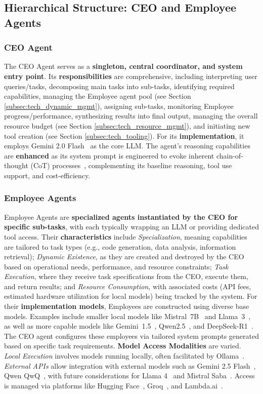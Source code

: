 \documentclass[twocolumn]{article}
\begin{document}
\subsection{Hierarchical Structure: CEO and Employee Agents}

\subsubsection{CEO Agent}
The CEO Agent serves as a \textbf{singleton, central coordinator, and system entry point}. Its \textbf{responsibilities} are comprehensive, including interpreting user queries/tasks, decomposing main tasks into sub-tasks, identifying required capabilities, managing the Employee agent pool (see Section \ref{subsec:tech_dynamic_mgmt}), assigning sub-tasks, monitoring Employee progress/performance, synthesizing results into final output, managing the overall resource budget (see Section \ref{subsec:tech_resource_mgmt}), and initiating new tool creation (see Section \ref{subsec:tech_tooling}). For its \textbf{implementation}, it employs Gemini 2.0 Flash~\cite{gemini20flash} as the core LLM. The agent's reasoning capabilities are \textbf{enhanced} as its system prompt is engineered to evoke inherent chain-of-thought (CoT) processes~\cite{wei2022chain}, complementing its baseline reasoning, tool use support, and cost-efficiency.

\subsubsection{Employee Agents}
Employee Agents are \textbf{specialized agents instantiated by the CEO for specific sub-tasks}, with each typically wrapping an LLM or providing dedicated tool access.
Their \textbf{characteristics} include \textit{Specialization}, meaning capabilities are tailored to task types (e.g., code generation, data analysis, information retrieval); \textit{Dynamic Existence}, as they are created and destroyed by the CEO based on operational needs, performance, and resource constraints; \textit{Task Execution}, where they receive task specifications from the CEO, execute them, and return results; and \textit{Resource Consumption}, with associated costs (API fees, estimated hardware utilization for local models) being tracked by the system.
For their \textbf{implementation models}, Employees are constructed using diverse base models. Examples include smaller local models like Mistral~7B~\cite{jiang2023mistral} and Llama~3~\cite{llama3herd}, as well as more capable models like Gemini~1.5~\cite{gemini1.5_report}, Qwen2.5~\cite{qwen2.5_report}, and DeepSeek-R1~\cite{deepseekr1_report}. The CEO agent configures these employees via tailored system prompts generated based on specific task requirements.
\textbf{Model Access Modalities} are varied. \textit{Local Execution} involves models running locally, often facilitated by Ollama~\cite{ollama}. \textit{External APIs} allow integration with external models such as Gemini 2.5 Flash~\cite{gemini25flash}, Qwen QwQ~\cite{QwenQwQ32B2025}, with future considerations for Llama 4~\cite{Llama4Herd2025} and Mistral Saba~\cite{MistralSaba2025}. Access is managed via platforms like Hugging Face~\cite{huggingface2025}, Groq~\cite{groq2025}, and Lambda.ai~\cite{lambda2025}.
\end{document}
